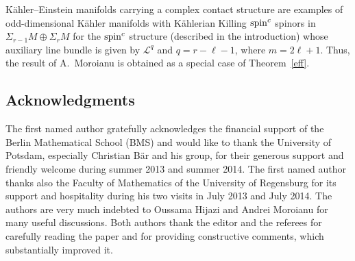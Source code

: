 \documentclass[10pt,a4paper]{amsart}
\numberwithin{equation}{section}
\theoremstyle{definition}
\begin{document}
K\"ahler--Einstein manifolds carrying a complex contact structure are examples of odd-di\-men\-sional  K\"ahler manifolds with K\"ahlerian Killing ${\mathop{\rm spin}^c}$ spinors in $\Sigma_{r-1} M \oplus\Sigma_r M $ for the ${\mathop{\rm spin}^c}$ structure (described in the introduction) whose auxiliary line bundle is given by $\mathcal L^q$ and $q = r-\ell-1$, where $m=2\ell+1$. Thus, the result of A.~Moroianu is obtained as a special case of Theorem~\ref{eff}.



\subsection*{Acknowledgments}

The f\/irst named author gratefully acknowledges the f\/inancial support of the Berlin Mathematical
School (BMS) and would like to thank the University of Potsdam, especially
Christian B\"ar and his group, for their generous support and friendly welcome during summer 2013
and summer 2014. The f\/irst named author thanks also the Faculty of Mathematics of the
University of Regensburg  for its support and hospitality during his two visits in July 2013 and July 2014.
The authors are very much indebted to Oussama Hijazi and Andrei Moroianu for many useful discussions. Both authors thank the editor and the referees for carefully reading the paper and for providing constructive comments, which substantially improved it.

\end{document}
